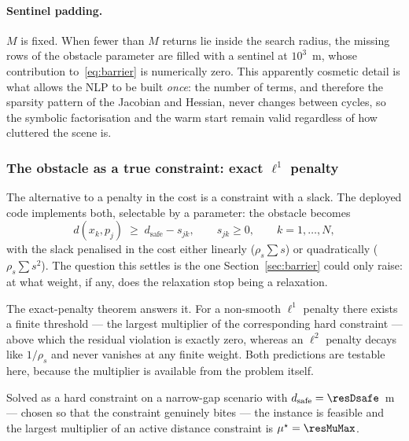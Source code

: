\documentclass[11pt,a4paper]{article}
\newcommand{\dsafe}{d_{\mathrm{safe}}}
\begin{document}
\paragraph{Sentinel padding.} $M$ is fixed. When fewer than $M$ returns lie inside the search radius, the
missing rows of the obstacle parameter are filled with a sentinel at $10^3$~m, whose contribution
to~\eqref{eq:barrier} is numerically zero. This apparently cosmetic detail is what allows the NLP to be built
\emph{once}: the number of terms, and therefore the sparsity pattern of the Jacobian and Hessian, never
changes between cycles, so the symbolic factorisation and the warm start remain valid regardless of how
cluttered the scene is.

\subsubsection{The obstacle as a true constraint: exact \texorpdfstring{$\ell^1$}{l1} penalty}
\label{sec:l1}

The alternative to a penalty in the cost is a constraint with a slack. The deployed code implements both,
selectable by a parameter: the obstacle becomes
\begin{equation}
  d(x_k,p_j)\;\ge\;\dsafe-s_{jk},\qquad s_{jk}\ge0,\qquad k=1,\dots,N,
  \label{eq:slack}
\end{equation}
with the slack penalised in the cost either linearly ($\rho_s\sum s$) or quadratically ($\rho_s\sum s^2$). The
question this settles is the one Section~\ref{sec:barrier} could only raise: at what weight, if any, does the
relaxation stop being a relaxation.

The exact-penalty theorem answers it. For a non-smooth $\ell^1$ penalty there exists a finite threshold ---
the largest multiplier of the corresponding hard constraint --- above which the residual violation is exactly
zero, whereas an $\ell^2$ penalty decays like $1/\rho_s$ and never vanishes at any finite weight. Both
predictions are testable here, because the multiplier is available from the problem itself.

Solved as a hard constraint on a narrow-gap scenario with $\dsafe=\resDsafe$~m --- chosen so that the
constraint genuinely bites --- the instance is feasible and the largest multiplier of an active distance
constraint is $\mu^\star=\resMuMax$.

\begin{table}[htbp]
  \centering
  \small
  \caption{Residual constraint violation against the penalty weight, for the non-smooth and the smooth relaxation of the same distance constraint. Bold: the violations that are exactly zero, which is the result the exact-penalty theorem predicts and the smooth relaxation never attains. Zero entries are below the solver tolerance of $1\times 10^{-8}$~m.}
  \label{res:tab:penalty}
\end{table}
\end{document}
